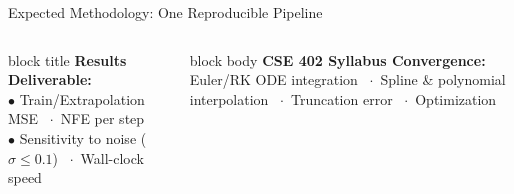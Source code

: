 \documentclass[aspectratio=169,10pt]{beamer}
\begin{document}
\begin{frame}{Expected Methodology: One Reproducible Pipeline}
\begin{center}
  \end{center}

  \vspace{0.55em}
  \begin{columns}[T,onlytextwidth]
      \begin{beamercolorbox}[rounded=true,sep=0.45em]{block title}
        \scriptsize\textbf{Results Deliverable:}\\[0.15em]
        $\bullet$ Train/Extrapolation MSE \ $\cdot$\ NFE per step\\
        $\bullet$ Sensitivity to noise ($\sigma \le 0.1$) \ $\cdot$\ Wall-clock speed
      \end{beamercolorbox}
      \begin{beamercolorbox}[rounded=true,sep=0.45em]{block body}
        \scriptsize\textbf{CSE 402 Syllabus Convergence:}\\[0.15em]
        Euler/RK ODE integration \ $\cdot$\ Spline \& polynomial interpolation \ $\cdot$\ Truncation error \ $\cdot$\ Optimization
      \end{beamercolorbox}
  \end{columns}
\end{frame}
\end{document}
